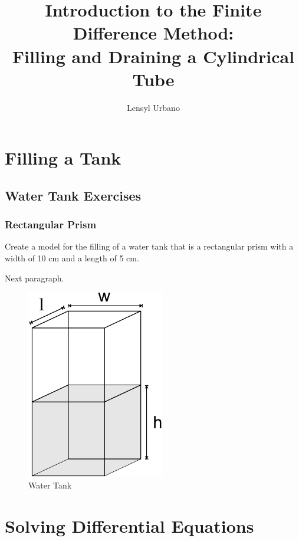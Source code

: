 \documentclass[11pt,fleqn]{book}
\title{Introduction to the Finite Difference Method: \\ Filling and Draining a Cylindrical Tube}
\author{Lensyl Urbano}
\begin{document}
         
 
\maketitle

\chapter{Filling a Tank}

    \section{Water Tank Exercises}

	\subsection{Rectangular Prism}
	
		Create a model for the filling of a water tank that is a rectangular prism with a width of 10 cm and a length of 5 cm.
		
		Next paragraph.
		
	\begin{figure}[h!]
		\begin{center}
			\includegraphics[width=6cm]{prism-lwh.pdf}
			\caption{Water Tank}
		\end{center}
	\end{figure}


	
\chapter{Solving Differential Equations}
\end{document}
